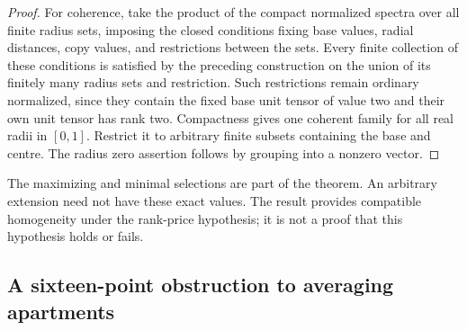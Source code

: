 \begin{proof}
For coherence, take the product of the compact normalized spectra
over all finite radius sets, imposing the closed conditions fixing
base values, radial distances, copy values, and restrictions between
the sets. Every finite collection of these conditions is satisfied
by the preceding construction on the union of its finitely many
radius sets and restriction. Such restrictions remain ordinary
normalized, since they contain the fixed base unit tensor of value
two and their own unit tensor has rank two. Compactness gives one
coherent family for all real radii in $[0,1]$. Restrict it to
arbitrary finite subsets containing the base and centre. The radius
zero assertion follows by grouping into a nonzero vector.
\end{proof}

The maximizing and minimal selections are part of the theorem.
An arbitrary extension need not have these exact values. The result
provides compatible homogeneity under the rank-price hypothesis;
it is not a proof that this hypothesis holds or fails.


\subsection{A sixteen-point obstruction to averaging apartments}

